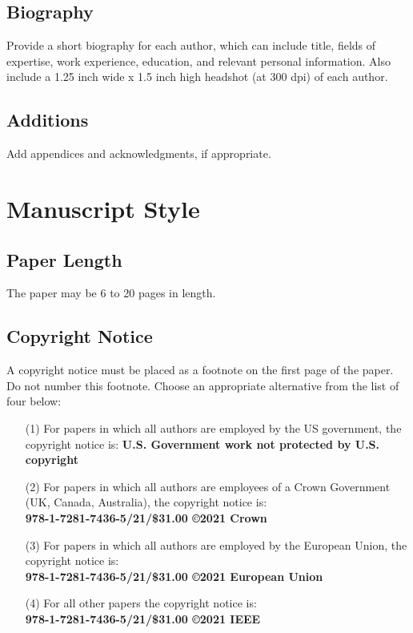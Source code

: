 \documentclass[twocolumn,letterpaper]{IEEEAerospaceCLS}  %
\begin{document}
\subsection{Biography}
Provide a short biography for each author, which can include title, fields of expertise, work experience, education, and relevant personal information. Also include a 1.25 inch wide x 1.5 inch high headshot (at 300 dpi) of each author.

\subsection{Additions}
Add appendices and acknowledgments, if appropriate.



\section{Manuscript Style}

\subsection{Paper Length}
The paper may be 6 to 20 pages in length.

\subsection{Copyright Notice}
A copyright notice must be placed as a footnote on the first page of the paper. Do not number this footnote. Choose an appropriate alternative from the list of four below:
\begin{itemize}
  \item [(1)] For papers in which all authors are employed by the US government, the copyright notice is: \textbf {U.S. Government work not protected by U.S. copyright} \\
  \item [(2)] For papers in which all authors are employees of a Crown Government (UK, Canada, Australia), the copyright notice is: \\{\bf 978-1-7281-7436-5/21/\$31.00 \copyright2021 Crown}\\
  \item [(3)] For papers in which all authors are employed by the European Union, the copyright notice is: \\{\bf 978-1-7281-7436-5/21/\$31.00 \copyright2021 European Union}\\
  \item [(4)]  For all other papers the copyright notice is: \\{\bf  978-1-7281-7436-5/21/\$31.00 \copyright2021 IEEE}
\end{itemize}
\end{document}
